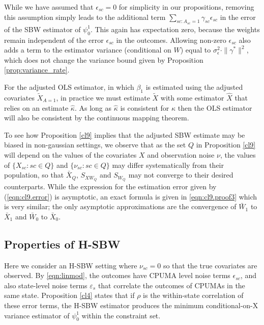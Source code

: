 \begin{remark}
    While we have assumed that $\epsilon_{sc}=0$ for simplicity in our propositions, removing this assumption simply leads to the additional term $\sum_{sc: A_{sc} = 1}\gamma_{sc}\epsilon_{sc}$ in the error of the SBW estimator of $\psi_0^1$. This again has expectation zero, because the weights remain independent of the error $\epsilon_{sc}$ in the outcomes. Allowing non-zero $\epsilon_{sc}$ also adds a term to the estimator variance (conditional on $W$) equal to $\sigma^2_{\epsilon}\cdot \|\gamma^*\|^2$,    which does not change the variance bound given by Proposition \ref{prop:variance_rate}.
\end{remark}


\begin{remark}
    For the adjusted OLS estimator, in which $\beta_1$ is estimated using the adjusted covariates $\tilde{X}_{A=1}$, in practice we must estimate $\tilde{X}$ with some estimator $\hat{X}$ that relies on an estimate $\hat{\kappa}$. As long as $\hat{\kappa}$ is consistent for $\kappa$ then the OLS estimator will also be consistent by the continuous mapping theorem.
\end{remark}

\begin{remark}
To see how Proposition \ref{cl9} implies that the adjusted SBW estimate may be biased in non-gaussian settings, we observe that as the set $Q$ in Proposition \ref{cl9} will depend on the values of the covariates $X$ and observation noise $\nu$, the values of $\{X_{sc}: sc \in Q\}$ and $\{\nu_{sc}: sc \in Q\}$ may differ systematically from their population, so that $\bar{X}_Q$, $S_{XW_Q}$ and $S_{W_Q}$ may not converge to their desired counterparts. While the expression for the estimation error given by (\ref{eqn:cl9.error}) is asymptotic, an exact formula is given in  \eqref{eqn:cl9.proof3} which is very similar; the only asymptotic approximations are the convergence of $\bar{W}_1$ to $\bar{X}_1$ and $\bar{W}_0$ to $\bar{X}_0$.
\end{remark}

\subsection{Properties of H-SBW}\label{app:AsecII}

Here we consider an H-SBW setting where $\nu_{sc}=0$ so that the true covariates are observed. By \eqref{eqn:linmod}, the outcomes have CPUMA level noise terms  $\epsilon_{sc}$, and also state-level noise terms $\varepsilon_s$ that correlate the outcomes of CPUMAs in the same state. Proposition \ref{cl4} states that if $\rho$ is the within-state correlation of these error terms, the H-SBW estimator produces the minimum conditional-on-X variance estimator of $\psi_0^1$ within the constraint set.

